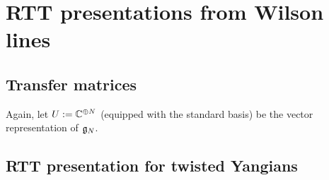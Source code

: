 \section{RTT presentations from Wilson lines}
    \subsection{Transfer matrices}
        Again, let $U := \mathbb{C}^{\oplus N}$ (equipped with the standard basis) be the vector representation of $\mathfrak{g}_N$. 

    \subsection{RTT presentation for twisted Yangians}